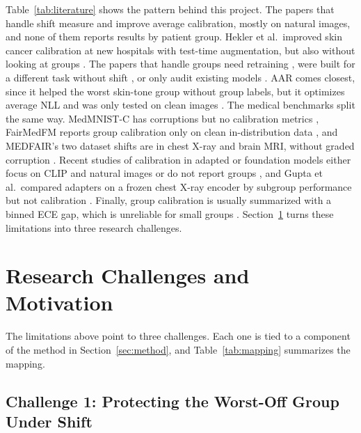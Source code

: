 \documentclass[sigconf,nonacm]{acmart}
\begin{document}
Table~\ref{tab:literature} shows the pattern behind this project. The papers that handle shift \cite{ovadia2019trust,tomani2021posthoc,tomani2023dac,roschewitz2025where} measure and improve average calibration, mostly on natural images, and none of them reports results by patient group. Hekler et al.\ improved skin cancer calibration at new hospitals with test-time augmentation, but also without looking at groups \cite{hekler2023tta}. The papers that handle groups need retraining \cite{shui2023clusterfocal}, were built for a different task without shift \cite{salvador2022faircal}, or only audit existing models \cite{dominique2025calibration}. AAR comes closest, since it helped the worst skin-tone group without group labels, but it optimizes average NLL and was only tested on clean images \cite{yuksekgonul2023atypicality}. The medical benchmarks split the same way. MedMNIST-C has corruptions but no calibration metrics \cite{disalvo2024medmnistc}, FairMedFM reports group calibration only on clean in-distribution data \cite{jin2024fairmedfm}, and MEDFAIR's two dataset shifts are in chest X-ray and brain MRI, without graded corruption \cite{zong2023medfair}. Recent studies of calibration in adapted or foundation models either focus on CLIP and natural images \cite{tu2024empirical,oh2024calibrated,murugesan2024robust} or do not report groups \cite{hekler2025beyond,huang2026uncertainty,lin2026crsbench}, and Gupta et al.\ compared adapters on a frozen chest X-ray encoder by subgroup performance but not calibration \cite{gupta2026subgroup}. Finally, group calibration is usually summarized with a binned ECE gap, which is unreliable for small groups \cite{kumar2019verified,riccilara2023calibration}. Section~\ref{sec:challenges} turns these limitations into three research challenges.

\section{Research Challenges and Motivation}
\label{sec:challenges}

The limitations above point to three challenges. Each one is tied to a component of the method in Section~\ref{sec:method}, and Table~\ref{tab:mapping} summarizes the mapping.

\subsection{Challenge 1: Protecting the Worst-Off Group Under Shift}
\label{sec:ch1}
\end{document}
